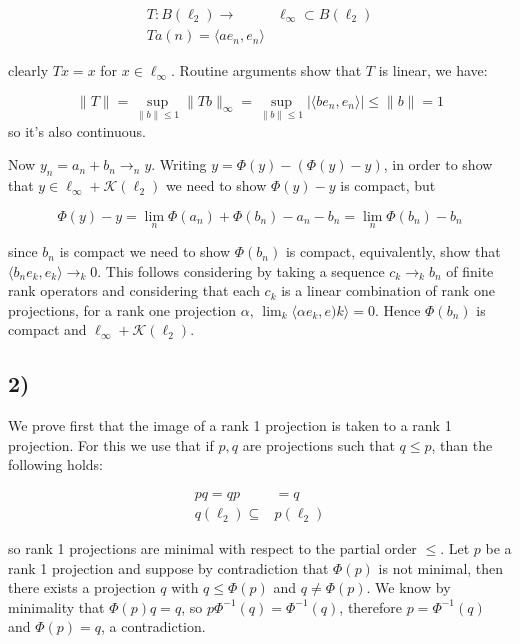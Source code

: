 \documentclass{article}
\begin{document}
\begin{align*}
    T:B(\ell_2)\to & \ell_\infty \subset B(\ell_2) \\
    Ta(n)=\langle ae_n,e_n  \rangle 
\end{align*}

clearly $Tx=x$ for $x\in \ell_\infty$. Routine arguments show
that $T$ is linear, we have:

\begin{equation}
    \|T\|=\sup_{\|b\|\leq 1} \|Tb\|_\infty=\sup_{\|b\|\leq 1} |\langle
        be_n,e_n
    \rangle|\leq \|b\|=1
\end{equation}
 so it's also continuous.

 Now $y_n=a_n+ b_n\to_n y$. Writing $y=\Phi(y)-(\Phi(y)-y)$, in order to show
 that $y\in  \ell_\infty+ \mathcal{K}(\ell_2)$ we need to show 
$\Phi(y)-y$ is compact, but

\begin{equation}
    \Phi(y)-y=\lim_{n} \Phi(a_n)+\Phi(b_n)-a_n-b_n=\lim_n \Phi(b_n)-b_n
\end{equation}

since $b_n$ is compact we need to show $\Phi(b_n)$ is compact, equivalently,
show that $\langle b_n e_k,e_k \rangle\to_k 0 $. This follows considering by 
taking a sequence $c_k\to_k b_n$ of finite rank operators and considering that
each $c_k$ is a linear combination of rank one projections, for a rank one
projection $\alpha$, $\lim_k \langle \alpha e_k,e)k \rangle =0$. Hence $\Phi(b_n)$
is compact and $\ell_\infty + \mathcal{K}(\ell_2)$. 
\subsection*{2)}
We prove first that the image of a rank 1 projection is taken to a rank 
1 projection. For this we use that if $p,q$ are projections such that 
$q\leq p$, than the following holds:

\begin{align*}
    pq=qp&=q\\
    q(\ell_2)\subseteq & p(\ell_2)
\end{align*}

so rank 1 projections are minimal with respect to the partial order $\leq$.
Let $p$ be a rank 1 projection and suppose by contradiction that $\Phi(p)$ 
is not minimal, then there exists a projection $q$ with $q\leq \Phi(p)$ and
$q\neq \Phi(p)$. We know by minimality that $\Phi(p)q=q$, so $p\Phi^{-1}(q)=
\Phi^{-1}(q)$, therefore $p=\Phi^{-1}(q)$ and $\Phi(p)=q$, a contradiction.
\end{document}
